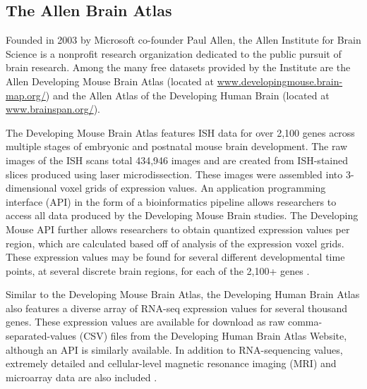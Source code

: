 \documentclass[12pt,oneside,onecolumn,a4paper]{article}
\begin{document}
\subsection{The Allen Brain Atlas}
Founded in 2003 by Microsoft co-founder Paul Allen, the Allen Institute for Brain Science is a nonprofit research organization dedicated to the public pursuit of brain research. Among the many free datasets provided by the Institute are the Allen Developing Mouse Brain Atlas (located at \href{http://www.developingmouse.brain-map.org/}{www.developingmouse.brain-map.org/}) and the Allen Atlas of the Developing Human Brain (located at \href{http://www.brainspan.org/}{www.brainspan.org/}).

The Developing Mouse Brain Atlas features ISH data for over 2,100 genes across multiple stages of embryonic and postnatal mouse brain development. The raw images of the ISH scans total 434,946 images and are created from ISH-stained slices produced using laser microdissection. These images were assembled into 3-dimensional voxel grids of expression values. An application programming interface (API) in the form of a bioinformatics pipeline allows researchers to access all data produced by the Developing Mouse Brain studies. The Developing Mouse API further allows researchers to obtain quantized expression values per region, which are calculated based off of analysis of the expression voxel grids. These expression values may be found for several different developmental time points, at several discrete brain regions, for each of the 2,100+ genes \citep{Thompson_2014}.

Similar to the Developing Mouse Brain Atlas, the Developing Human Brain Atlas also features a diverse array of RNA-seq expression values for several thousand genes. These expression values are available for download as raw comma-separated-values (CSV) files from the Developing Human Brain Atlas Website, although an API is similarly available. In addition to RNA-sequencing values, extremely detailed and cellular-level magnetic resonance imaging (MRI) and microarray data are also included \citep{24695229}. 
\end{document}
